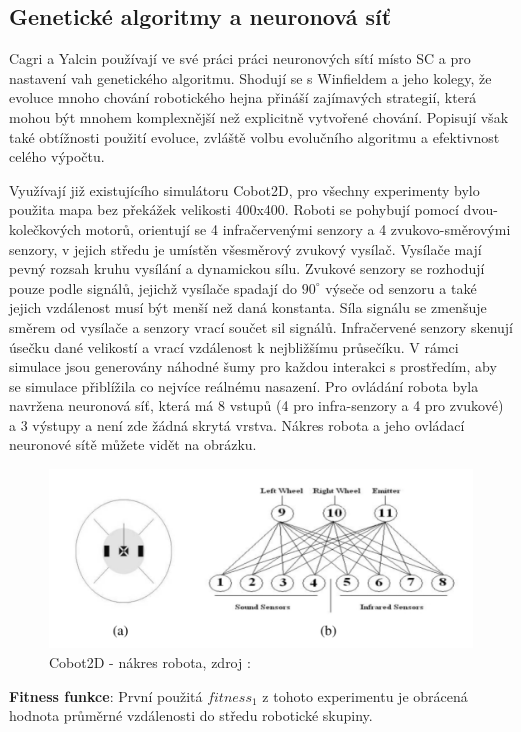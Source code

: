 \subsection*{Genetické algoritmy a neuronová síť}
Cagri a Yalcin používají ve své práci \citep{yalcin2008evolving} práci neuronových sítí místo SC a pro nastavení vah genetického algoritmu. Shodují se s Winfieldem a jeho kolegy, že evoluce mnoho chování robotického hejna přináší zajímavých strategií, která mohou být mnohem komplexnější než explicitně vytvořené chování. Popisují však také obtížnosti použití evoluce, zvláště volbu evolučního algoritmu a efektivnost celého výpočtu. 
\par
Využívají již existujícího simulátoru Cobot2D, pro všechny experimenty bylo použita mapa bez překážek velikosti 400x400. Roboti se pohybují pomocí dvou-kolečkových motorů, orientují se 4 infračervenými senzory a 4 zvukovo-směrovými senzory, v jejich středu je umístěn všesměrový zvukový vysílač. Vysílače mají pevný rozsah kruhu vysílání a dynamickou sílu. Zvukové senzory se rozhodují pouze podle signálů, jejichž vysílače spadají do $90^\circ$ výseče od senzoru a také jejich vzdálenost musí být menší než daná konstanta. Síla signálu se zmenšuje směrem od vysílače a senzory vrací součet sil signálů. Infračervené senzory skenují úsečku dané velikostí a vrací vzdálenost k nejbližšímu průsečíku. V rámci simulace jsou generovány náhodné šumy pro každou interakci s prostředím, aby se simulace přiblížila co nejvíce reálnému nasazení. Pro ovládání robota byla navržena neuronová síť, která má 8 vstupů (4 pro infra-senzory a 4 pro zvukové) a 3 výstupy a není zde žádná skrytá vrstva. Nákres robota a jeho ovládací neuronové sítě můžete vidět na obrázku. \par
\begin{figure}[h]\centering
\includegraphics[scale=0.5]{../img/Cobot.png}
\caption{Cobot2D - nákres robota, zdroj : \citep{yalcin2008evolving} }
\end{figure}
\textbf{Fitness funkce}: První použitá $fitness_1$ z tohoto experimentu je obrácená hodnota průměrné vzdálenosti do středu robotické skupiny. 
